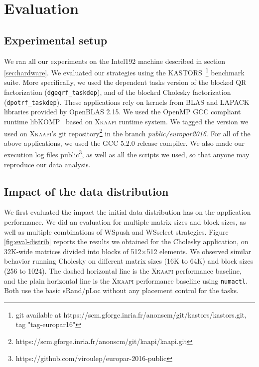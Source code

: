 \documentclass{Styles/llncs}
\newcommand{\kaapi}{\textsc{\mbox{Xkaapi}}\xspace}
\begin{document}

\section{Evaluation}
\label{sec:performances-evaluation}

\subsection{Experimental setup}

We ran all our experiments on the Intel192 machine described in section \ref{sec:hardware}.
We evaluated our strategies using the KASTORS~\cite{virouleau:hal-01081974}\footnote{git available at https://scm.gforge.inria.fr/anonscm/git/kastors/kastors.git, tag "tag-europar16"} benchmark suite.
More specifically, we used the dependent tasks version of the blocked QR factorization
(\verb/dgeqrf_taskdep/), and of the blocked Cholesky factorization (\verb/dpotrf_taskdep/).
These applications rely on kernels from BLAS and LAPACK libraries provided by OpenBLAS 2.15.
We used the OpenMP GCC compliant runtime libKOMP~\cite{libkomp} based on \kaapi runtime system. We tagged the version we used on \kaapi's
git repository\footnote{https://scm.gforge.inria.fr/anonscm/git/kaapi/kaapi.git } in the branch \emph{public/europar2016}.
For all of the above applications, we used the GCC 5.2.0 release compiler.
We also made our execution log files public\footnote{https://github.com/viroulep/europar-2016-public}, as well as all the scripts we used, so that
anyone may reproduce our data analysis.

\subsection{Impact of the data distribution}

We first evaluated the impact the initial data distribution has on the application performance. We did an evaluation for multiple matrix sizes and block sizes,
as well as multiple combinations of WSpush and WSselect strategies. Figure \ref{fig:eval-distrib} reports the
results we obtained for the Cholesky application, on 32K-wide matrices divided into blocks of 512$\times$512 elements. We observed similar behavior running Cholesky on different matrix sizes (16K to 64K) and block sizes (256 to 1024).
The dashed horizontal line is the \kaapi performance baseline, and the plain
horizontal line is the \kaapi performance baseline using \verb/numactl/. Both use the basic sRand/pLoc without any placement control for the tasks.
\end{document}
